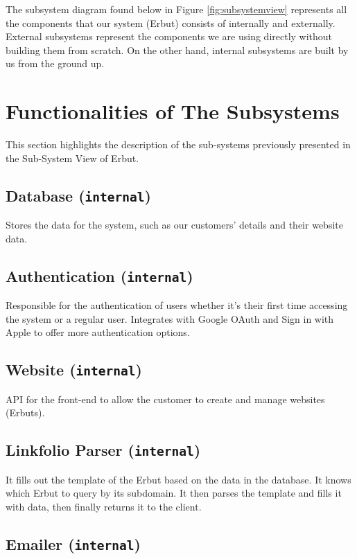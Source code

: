 \documentclass{article}
\begin{document}
The subsystem diagram found below in Figure \ref{fig:subsystemview} represents all the components that our system (Erbut) consists of internally and externally. External subsystems represent the components we are using directly without building them from scratch. On the other hand, internal subsystems are built by us from the ground up.

\section{Functionalities of The Subsystems}

This section highlights the description of the sub-systems previously presented in the Sub-System View of Erbut.

\subsection{Database (\texttt{internal})}

Stores the data for the system, such as our customers’ details and their website data.

\subsection{Authentication (\texttt{internal})}

Responsible for the authentication of users whether it’s their first time accessing the system or a regular user. Integrates with Google OAuth and Sign in with Apple to offer more authentication options.

\subsection{Website (\texttt{internal})}

API for the front-end to allow the customer to create and manage websites (Erbuts).

\subsection{Linkfolio Parser (\texttt{internal})}

It fills out the template of the Erbut based on the data in the database. It knows which Erbut to query by its subdomain. It then parses the template and fills it with data, then finally returns it to the client.

\subsection{Emailer (\texttt{internal})}
\end{document}
